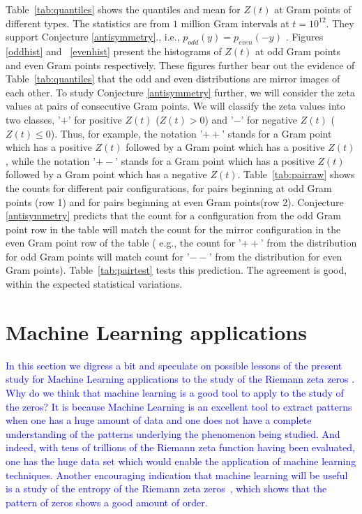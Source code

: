 \documentclass[twoside]{article}
\theoremstyle{definition}
\begin{document}
Table~\ref{tab:quantiles} shows the quantiles and mean for  $Z(t)$ at Gram points of different types.  The statistics are from $1$ million Gram intervals at $t=10^{12}$. They support 
Conjecture \ref{antisymmetry}., i.e.,  $p_{odd}(y) = p_{even}(-y)$ .
Figures \ref{oddhist} and ~\ref{evenhist}  present the histograms of $Z(t)$ at odd Gram points and even Gram points respectively. These figures further bear out the evidence of Table~\ref{tab:quantiles} that the odd and even distributions are mirror images of each other. To study Conjecture \ref{antisymmetry} further, we will consider the zeta values at pairs of consecutive Gram points. We will classify the zeta values into two classes, '$+$' for positive $Z(t)$  ($Z(t) > 0$) and '$-$' for negative $Z(t)$ ($Z(t) \leqslant  0$). Thus, for example, the notation '$++$' stands for a Gram point which has a positive $Z(t)$ followed by a Gram point which has a positive $Z(t)$, while the notation '$+-$' stands for a Gram point which has a positive $Z(t)$ followed by a Gram point which has a negative $Z(t)$. Table~\ref{tab:pairraw} shows the counts for different pair configurations, for pairs beginning at odd Gram points (row 1) and for pairs beginning at even Gram points(row 2). Conjecture \ref{antisymmetry} predicts that the count for a configuration from the odd Gram point row in the table  will match the count for the mirror configuration in the even Gram point row of the table ( e.g., the count for '$++$' from the distribution for odd Gram points will match count for '$--$' from the distribution for even Gram points). Table~\ref{tab:pairtest} tests this prediction. The agreement is good, within the expected statistical variations. 

\section{\label{machineLearning}Machine Learning applications}

 \textcolor{blue}{ 
In this section we digress a bit and speculate on possible lessons of the present study for Machine Learning applications to the study of the Riemann zeta zeros \cite{osneural,osentropy}.
Why do we think that machine learning is a good tool to apply to the study of the zeros? It is because Machine Learning is an excellent tool to extract patterns when one has a huge amount of data and one does not have a complete understanding of the patterns underlying the phenomenon being studied. And indeed, with tens of trillions of the Riemann zeta function having been evaluated, one has the huge data set which would enable the application of machine learning techniques. Another encouraging indication that machine learning will be useful is a study of the entropy of the Riemann zeta zeros~\cite{osentropy}, which shows that the pattern of zeros shows a good amount of order.
}
\end{document}
